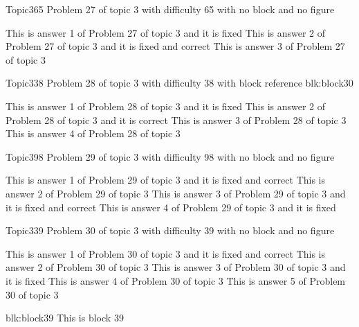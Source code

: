\documentclass[master]{exam}
\begin{document}
\begin{problem}{Topic3}{65}
	Problem 27 of topic 3 with difficulty 65 with no block and no figure
	\begin{answers}
		\answer[fixed] This is answer 1 of Problem 27 of topic 3 and it is fixed
		 This is answer 2 of Problem 27 of topic 3 and it is fixed and correct
		\answer This is answer 3 of Problem 27 of topic 3 
	\end{answers}
\end{problem}

\begin{problem}[requires=blk:block30]{Topic3}{38}
	Problem 28 of topic 3 with difficulty 38 with block reference blk:block30
	\begin{answers}
		\answer[fixed] This is answer 1 of Problem 28 of topic 3 and it is fixed
		\answer[correct] This is answer 2 of Problem 28 of topic 3 and it is correct
		\answer This is answer 3 of Problem 28 of topic 3 
		\answer This is answer 4 of Problem 28 of topic 3 
	\end{answers}
\end{problem}

\begin{problem}{Topic3}{98}
	Problem 29 of topic 3 with difficulty 98 with no block and no figure
	\begin{answers}
		 This is answer 1 of Problem 29 of topic 3 and it is fixed and correct
		\answer This is answer 2 of Problem 29 of topic 3 
		 This is answer 3 of Problem 29 of topic 3 and it is fixed and correct
		\answer[fixed] This is answer 4 of Problem 29 of topic 3 and it is fixed
	\end{answers}
\end{problem}

\begin{problem}{Topic3}{39}
	Problem 30 of topic 3 with difficulty 39 with no block and no figure
	\begin{answers}
		 This is answer 1 of Problem 30 of topic 3 and it is fixed and correct
		\answer This is answer 2 of Problem 30 of topic 3 
		\answer[fixed] This is answer 3 of Problem 30 of topic 3 and it is fixed
		\answer This is answer 4 of Problem 30 of topic 3 
		\answer This is answer 5 of Problem 30 of topic 3 
	\end{answers}
\end{problem}



\begin{block}{blk:block39}
This is block 39
\end{block}
\end{document}
